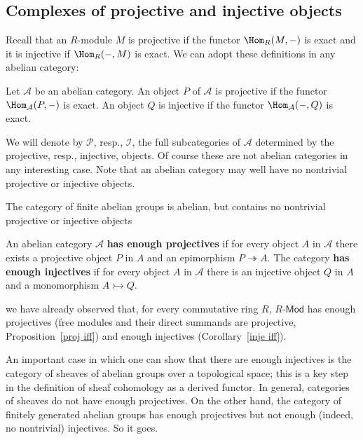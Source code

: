 \subsection{Complexes of projective and injective objects}
Recall that an $R$-module $M$ is projective if the functor $\Hom_R(M,-)$ is exact and it is injective if $\Hom_R(-,M)$ is exact. We can adopt these definitions in any abelian category:
\begin{definition}
Let $\mathcal{A}$ be an abelian category. An object $P$ of $\mathcal{A}$ is projective if the functor $\Hom_{\mathcal{A}}(P,-)$ is exact. An object $Q$ is injective if the functor $\Hom_{\mathcal{A}}(-,Q)$ is
exact.
\end{definition}
We will denote by $\mathcal{P}$, resp., $\mathcal{I}$, the full subcategories of $\mathcal{A}$ determined by the projective, resp., injective, objects. Of course these are not abelian categories in
any interesting case. Note that an abelian category may well have no nontrivial projective or injective objects.
\begin{example}
The category of finite abelian groups is abelian, but contains no nontrivial projective or injective objects
\end{example}
\begin{definition}
An abelian category $\mathcal{A}$ \textbf{has enough projectives} if for every object $A$ in $\mathcal{A}$ there exists a projective object $P$ in $A$ and an epimorphism $P\twoheadrightarrow A$. The category \textbf{has enough injectives} if for every object $A$ in $\mathcal{A}$ there is an injective object $Q$ in $A$ and a monomorphism $A\rightarrowtail Q$.
\end{definition}
we have already observed that, for every commutative ring $R$, $R$-$\mathsf{Mod}$ has enough projectives (free modules and their direct summands are projective, Proposition~\ref{proj iff}) and enough injectives (Corollary~\ref{inje iff}).\par
An important case in which one can show that there are enough injectives is the category of sheaves of abelian groups over a topological space; this is a key step in the definition of sheaf cohomology as a derived functor. In general, categories of sheaves do not have enough projectives. On the other hand,
the category of finitely generated abelian groups has enough projectives but not enough (indeed, no nontrivial) injectives. So it goes.
